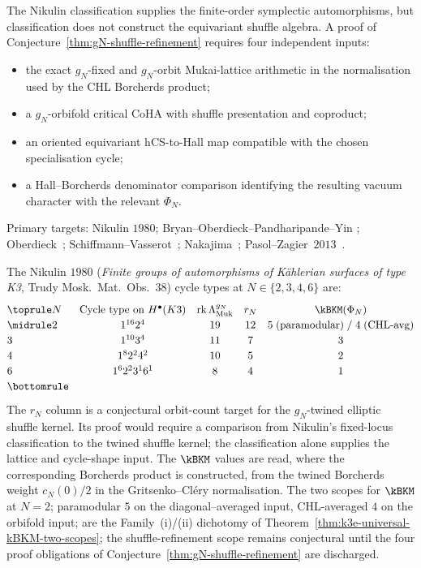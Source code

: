 \begin{remark}
The Nikulin classification supplies the finite-order symplectic
automorphisms, but classification does not construct the equivariant
shuffle algebra. A proof of Conjecture~\ref{thm:gN-shuffle-refinement}
requires four independent inputs:
\begin{itemize}
\item the exact $g_N$-fixed and $g_N$-orbit Mukai-lattice arithmetic in the
normalisation used by the CHL Borcherds product;
\item a $g_N$-orbifold critical CoHA with shuffle presentation and
coproduct;
\item an oriented equivariant hCS-to-Hall map compatible with the
chosen specialisation cycle;
\item a Hall--Borcherds denominator comparison identifying the resulting
vacuum character with the relevant $\Phi_N$.
\end{itemize}
Primary targets: Nikulin $1980$; Bryan--Oberdieck--Pandharipande--Yin
\cite{BOPY2018}; Oberdieck~\cite{Oberdieck2017};
Schiffmann--Vasserot~\cite{SV13}; Nakajima~\cite{Nakajima1999};
Pasol--Zagier~$2013$~\cite{PasolZagier2013}.
\end{remark}

\begin{remark}
\label{rem:gN-cycle-types}
The Nikulin $1980$ (\emph{Finite groups of automorphisms of K\"ahlerian surfaces of type K3}, Trudy Mosk.\ Mat.\ Obs.~$38$) cycle types at $N \in \{2, 3, 4, 6\}$ are:
\[
\renewcommand{\arraystretch}{1.2}
\begin{array}{@{}lcccc@{}}
\toprule
N & \text{Cycle type on } H^\bullet(K3) & \text{rk}\,\Lambda^{g_N}_{\mathrm{Muk}} & r_N & \kBKM(\Phi_N) \\
\midrule
2 & 1^{16} 2^4 & 19 & 12 & 5 \;\text{(paramodular)}\; / \; 4 \;\text{(CHL-avg)} \\
3 & 1^{10} 3^4 & 11 & 7 & 3 \\
4 & 1^8 2^2 4^2 & 10 & 5 & 2 \\
6 & 1^6 2^2 3^1 6^1 & 8 & 4 & 1 \\
\bottomrule
\end{array}
\]
The $r_N$ column is a conjectural orbit-count target for the
$g_N$-twined elliptic shuffle kernel. Its proof would require a
comparison from Nikulin's fixed-locus classification to the twined
shuffle kernel; the classification alone supplies the lattice and
cycle-shape input. The $\kBKM$ values are read, where the corresponding
Borcherds product is constructed, from the twined Borcherds weight
$c_N(0)/2$ in the Gritsenko--Cl\'ery normalisation. The two scopes for
$\kBKM$ at $N = 2$; paramodular $5$ on the diagonal--averaged input,
CHL-averaged $4$ on the orbifold input; are the Family~(i)/(ii)
dichotomy of Theorem~\ref{thm:k3e-universal-kBKM-two-scopes}; the
shuffle-refinement scope remains conjectural until the four proof
obligations of Conjecture~\ref{thm:gN-shuffle-refinement} are discharged.
\end{remark}


